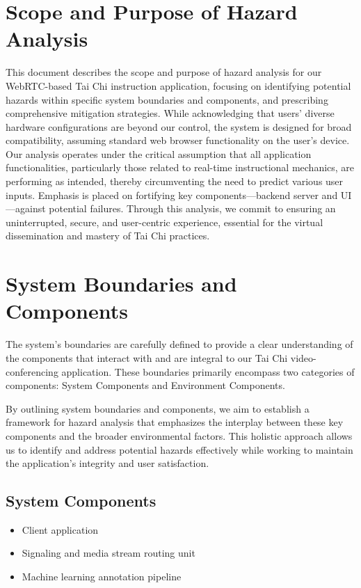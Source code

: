 \documentclass{article}
\begin{document}
\section{Scope and Purpose of Hazard Analysis}

This document describes the scope and purpose of hazard analysis for our
WebRTC-based Tai Chi instruction application, focusing on identifying potential
hazards within specific system boundaries and components, and prescribing
comprehensive mitigation strategies. While acknowledging that users' diverse
hardware configurations are beyond our control, the system is designed for broad
compatibility, assuming standard web browser functionality on the user's device.
Our analysis operates under the critical assumption that all application
functionalities, particularly those related to real-time instructional
mechanics, are performing as intended, thereby circumventing the need to predict
various user inputs. Emphasis is placed on fortifying key components---backend
server and UI---against potential failures. Through this analysis, we commit to
ensuring an uninterrupted, secure, and user-centric experience, essential for
the virtual dissemination and mastery of Tai Chi practices.


\section{System Boundaries and Components}

The system's boundaries are carefully defined to provide a clear understanding
of the components that interact with and are integral to our Tai Chi
video-conferencing application. These boundaries primarily encompass two
categories of components: System Components and Environment Components.

By outlining system boundaries and components, we aim to establish a framework
for hazard analysis that emphasizes the interplay between these key components
and the broader environmental factors. This holistic approach allows us to
identify and address potential hazards effectively while working to maintain the
application's integrity and user satisfaction.

\subsection{System Components}
\begin{itemize}
\item Client application
\item Signaling and media stream routing unit
\item Machine learning annotation pipeline
\end{itemize}
\end{document}
